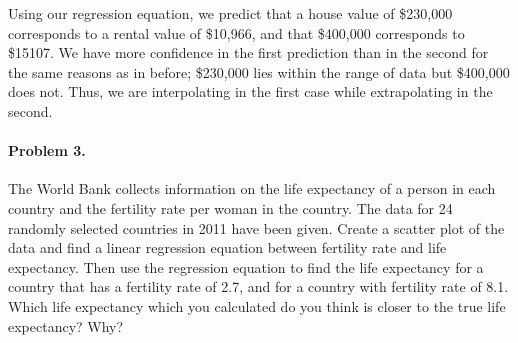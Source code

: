 \documentclass[10pt]{article}
\begin{document}
        Using our regression equation, we predict that a house value of \$230,000 corresponds to a rental value of \$10,966,
        and that \$400,000 corresponds to \$15107.
        We have more confidence in the first prediction than in the second for the same reasons as in before; \$230,000 lies
        within the range of data but \$400,000 does not. Thus, we are interpolating in the first case while extrapolating in the second.

        \paragraph{Problem 3.} The World Bank collects information on the life expectancy of a person in each country and the fertility rate
        per woman in the country. The data for 24 randomly selected countries in 2011 have been given. Create a scatter plot of the data
        and find a linear regression equation between fertility rate and life expectancy. Then use the regression equation to find the life
        expectancy for a country that has a fertility rate of 2.7, and for a country with fertility rate of 8.1.
        Which life expectancy which you calculated do you think is closer to the true life expectancy? Why?\\
        
\end{document}
